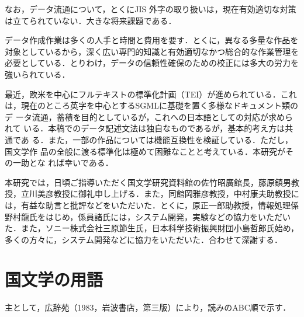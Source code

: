 なお，データ流通について，とくにJIS 外字の取り扱いは，現在有効適切な対策
は立てられていない．大きな将来課題である．

データ作成作業は多くの人手と時間と費用を要す．とくに，異なる多量な作品を
対象としているから，深く広い専門的知識と有効適切なかつ総合的な作業管理を
必要としている．とりわけ，データの信頼性確保のための校正には多大の労力を
強いられている．

最近，欧米を中心にフルテキストの標準化計画（TEI）が進められている．これ
は，現在のところ英字を中心とするSGMLに基礎を置く多様なドキュメント類のデ
ータ流通，蓄積を目的としているが，これへの日本語としての対応が求められて
いる．本稿でのデータ記述文法は独自なものであるが，基本的考え方は共通であ
る．また，一部の作品については機能互換性を検証している．ただし，国文学作
品の全般に渡る標準化は極めて困難なことと考えている．本研究がその一助とな
れば幸いである．

\acknowledgment

本研究では，日頃ご指導いただく国文学研究資料館の佐竹昭廣館長，藤原鎮男教
授，立川美彦教授に御礼申し上げる．また，同館岡雅彦教授，中村康夫助教授に
は，有益な助言と批評などをいただいた．とくに，原正一郎助教授，情報処理係
野村龍氏をはじめ，係員諸氏には，システム開発，実験などの協力をいただい
た．また，ソニー株式会社三原節生氏，日本科学技術振興財団小島哲郎氏始め，
多くの方々に，システム開発などに協力をいただいた．合わせて深謝する．






\newpage

\appendix

\section{国文学の用語}
\label{sec:furoku1}

主として，広辞苑（1983，岩波書店，第三版）により，読みのABC順で示す．

